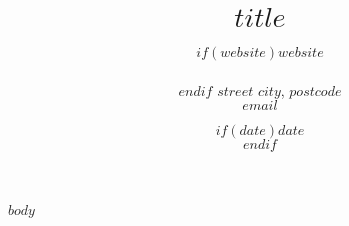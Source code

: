 \documentclass[11pt, a4paper]{article}
\title{$title$} %
\date{$if(date)$$date$\\$endif$} %
\author{$if(website)$$website$\\\\$endif$
$street$ $city$, $postcode$\\ %
$email$ } %
\begin{document}
\maketitle
\begin{raggedright}
	\justify
$body$
\end{raggedright}
\end{document}
